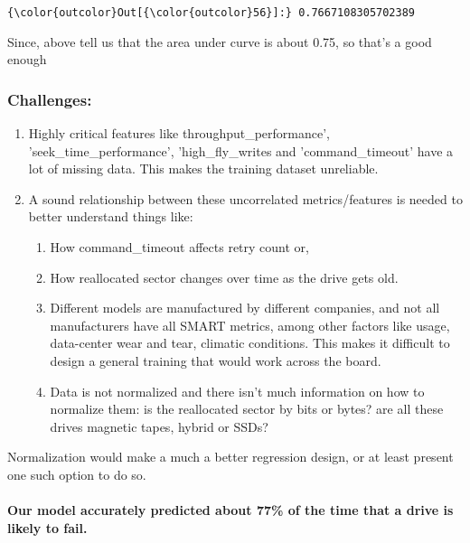 \documentclass[11pt]{article}
\providecommand{\tightlist}{%
      \setlength{\itemsep}{0pt}\setlength{\parskip}{0pt}}
\begin{document}
\begin{Verbatim}[commandchars=\\\{\}]
{\color{outcolor}Out[{\color{outcolor}56}]:} 0.7667108305702389
\end{Verbatim}
            
    Since, above tell us that the area under curve is about 0.75, so that's
a good enough

    \subsubsection{Challenges:}\label{challenges}

\begin{enumerate}
\def\labelenumi{\arabic{enumi}.}
\tightlist
\item
  Highly critical features like throughput\_performance',
  'seek\_time\_performance', 'high\_fly\_writes and 'command\_timeout'
  have a lot of missing data. This makes the training dataset
  unreliable.
\item
  A sound relationship between these uncorrelated metrics/features is
  needed to better understand things like:

  \begin{enumerate}
  \def\labelenumii{\arabic{enumii}.}
  \tightlist
  \item
    How command\_timeout affects retry count or,
  \item
    How reallocated sector changes over time as the drive gets old.
  \item
    Different models are manufactured by different companies, and not
    all manufacturers have all SMART metrics, among other factors like
    usage, data-center wear and tear, climatic conditions. This makes it
    difficult to design a general training that would work across the
    board.
  \item
    Data is not normalized and there isn't much information on how to
    normalize them: is the reallocated sector by bits or bytes? are all
    these drives magnetic tapes, hybrid or SSDs?
  \end{enumerate}
\end{enumerate}

Normalization would make a much a better regression design, or at least
present one such option to do so.

\paragraph{Our model accurately predicted about 77\% of the time that a
drive is likely to
fail.}\label{our-model-accurately-predicted-about-77-of-the-time-that-a-drive-is-likely-to-fail.}
\end{document}
